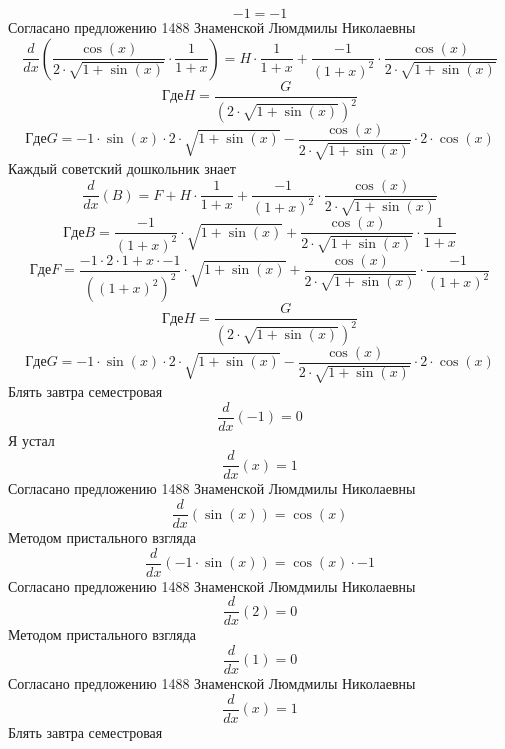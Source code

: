 \documentclass[12pt, a4paper]{article}
\begin{document}
\begin{equation}
-1 = -1
\end{equation}
Согласано предложению 1488 Знаменской Люмдмилы Николаевны
\begin{equation}
\frac{d}{dx}(\frac{\cos(x)}{2 \cdot \sqrt{1+\sin(x)}} \cdot \frac{1}{1+x}) = H \cdot \frac{1}{1+x}+\frac{-1}{{(1+x)}^{2}} \cdot \frac{\cos(x)}{2 \cdot \sqrt{1+\sin(x)}}
\end{equation}
$$Где H = \frac{G}{{(2 \cdot \sqrt{1+\sin(x)})}^{2}}$$
$$Где G = -1 \cdot \sin(x) \cdot 2 \cdot \sqrt{1+\sin(x)}-\frac{\cos(x)}{2 \cdot \sqrt{1+\sin(x)}} \cdot 2 \cdot \cos(x)$$
Каждый советский дошкольник знает
\begin{equation}
\frac{d}{dx}(B) = F+H \cdot \frac{1}{1+x}+\frac{-1}{{(1+x)}^{2}} \cdot \frac{\cos(x)}{2 \cdot \sqrt{1+\sin(x)}}
\end{equation}
$$Где B = \frac{-1}{{(1+x)}^{2}} \cdot \sqrt{1+\sin(x)}+\frac{\cos(x)}{2 \cdot \sqrt{1+\sin(x)}} \cdot \frac{1}{1+x}$$
$$Где F = \frac{-1 \cdot 2 \cdot 1+x \cdot -1}{{({(1+x)}^{2})}^{2}} \cdot \sqrt{1+\sin(x)}+\frac{\cos(x)}{2 \cdot \sqrt{1+\sin(x)}} \cdot \frac{-1}{{(1+x)}^{2}}$$
$$Где H = \frac{G}{{(2 \cdot \sqrt{1+\sin(x)})}^{2}}$$
$$Где G = -1 \cdot \sin(x) \cdot 2 \cdot \sqrt{1+\sin(x)}-\frac{\cos(x)}{2 \cdot \sqrt{1+\sin(x)}} \cdot 2 \cdot \cos(x)$$
Блять завтра семестровая
\begin{equation}
\frac{d}{dx}(-1) = 0
\end{equation}
Я устал
\begin{equation}
\frac{d}{dx}(x) = 1
\end{equation}
Согласано предложению 1488 Знаменской Люмдмилы Николаевны
\begin{equation}
\frac{d}{dx}(\sin(x)) = \cos(x)
\end{equation}
Методом пристального взгляда
\begin{equation}
\frac{d}{dx}(-1 \cdot \sin(x)) = \cos(x) \cdot -1
\end{equation}
Согласано предложению 1488 Знаменской Люмдмилы Николаевны
\begin{equation}
\frac{d}{dx}(2) = 0
\end{equation}
Методом пристального взгляда
\begin{equation}
\frac{d}{dx}(1) = 0
\end{equation}
Согласано предложению 1488 Знаменской Люмдмилы Николаевны
\begin{equation}
\frac{d}{dx}(x) = 1
\end{equation}
Блять завтра семестровая
\end{document}
